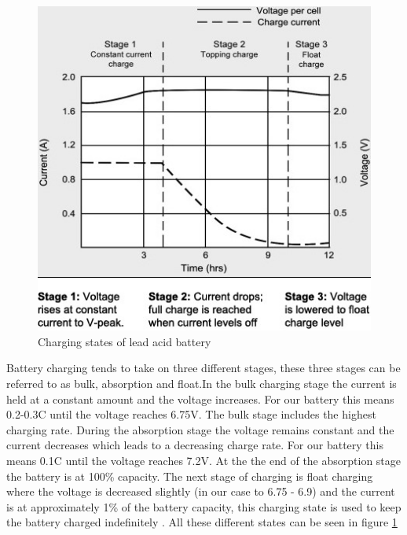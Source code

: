 \label{sec:BatteryCharging}
\begin{figure}
\centering
\includegraphics[scale=0.4]{Figures/cc.jpg}
\caption{Charging states of lead acid battery \cite{RS}}
\label{fig:states}
\end{figure}
 Battery charging tends to take on three different stages, these three stages can be referred to as bulk, absorption and float\cite{CC}.In the bulk charging stage the current is held at a constant amount and the voltage increases. For our battery this means 0.2-0.3C until the voltage reaches 6.75V\cite{RS}. The bulk stage includes the highest charging rate. During the absorption stage the voltage remains constant and the current decreases which leads to a decreasing charge rate. For our battery this means 0.1C until the voltage reaches 7.2V\cite{RS}. At the the end of the absorption stage the battery is at 100\% capacity. The next stage of charging is float charging where the voltage is decreased slightly (in our case to 6.75 - 6.9) and the current is at approximately 1\% of the battery capacity, this charging state is used to keep the battery charged indefinitely \cite{CC}. All these different states can be seen in figure \ref{fig:states} 






